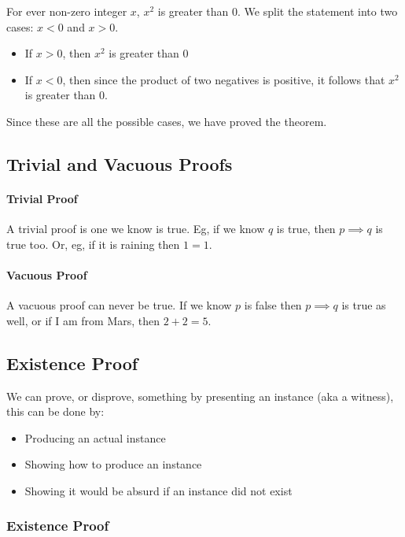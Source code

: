 For ever non-zero integer \(x\), \(x^2\) is greater than \(0\).
We split the statement into two cases: \(x<0\) and \(x>0\).
\begin{itemize}
    \item If \(x>0\), then \(x^2\) is greater than 0
    \item If \(x<0\), then since the product of two negatives is positive, it follows that \(x^2\) is greater than \(0\).
\end{itemize}
Since these are all the possible cases, we have proved the theorem.

\subsection{Trivial and Vacuous Proofs}\label{sub:trivial_and_vacuous_proofs}

\paragraph{Trivial Proof}\label{par:trivial_proof}

A trivial proof is one we know is true.
Eg, if we know \(q\) is true, then \(p \implies q\) is true too.
Or, eg, if it is raining then \(1=1\).

\paragraph{Vacuous Proof}\label{par:vacuous_proof}

A vacuous proof can never be true.
If we know \(p\) is false then \(p \implies q\) is true as well, or if I am from Mars, then \(2+2=5\).

\subsection{Existence Proof}\label{sub:existence_proof}

We can prove, or disprove, something by presenting an instance (aka a witness), this can be done by:
\begin{itemize}
    \item Producing an actual instance
    \item Showing how to produce an instance
    \item Showing it would be absurd if an instance did not exist
\end{itemize}

\subsubsection{Existence Proof}\label{ssub:existence_proof}

